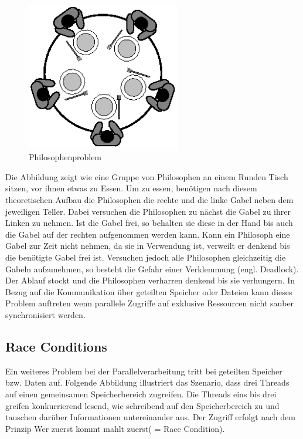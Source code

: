 \documentclass[12pt,oneside,a4paper,bibtotoc,liststotoc]{scrreprt}
\begin{document}
\begin{figure}[H]
  \begin{centering}
    \includegraphics[width=0.6\textwidth]{img/PhilosophenProblem.png}
    \caption{Philosophenproblem \cite[]{philosofen}}
    \label{Philosophenproblem}
  \end{centering}
\end{figure}
Die Abbildung zeigt wie eine Gruppe von Philosophen an einem Runden Tisch sitzen, vor ihnen etwas zu Essen. Um zu essen, benötigen nach diesem theoretischen Aufbau die Philosophen die rechte und die linke Gabel neben dem jeweiligen Teller. Dabei versuchen die Philosophen zu nächst die Gabel zu ihrer Linken zu nehmen. Ist die Gabel frei, so behalten sie diese in der Hand bis auch die Gabel auf der rechten aufgenommen werden kann. Kann ein Philosoph eine Gabel zur Zeit nicht nehmen, da sie in Verwendung ist, verweilt er denkend bis die benötigte Gabel frei ist. Versuchen jedoch alle Philosophen gleichzeitig die Gabeln aufzunehmen, so besteht die Gefahr einer Verklemmung (engl. Deadlock). Der Ablauf stockt und die Philosophen verharren denkend bis sie verhungern. In Bezug auf die Kommunikation über geteilten Speicher oder Dateien kann dieses Problem auftreten wenn parallele Zugriffe auf exklusive Ressourcen nicht sauber synchronisiert werden.



\subsection{Race Conditions}
Ein weiteres Problem bei der Parallelverarbeitung tritt bei geteilten Speicher bzw. Daten auf. Folgende Abbildung illustriert das Szenario, dass drei Threads auf einen gemeinsamen Speicherbereich zugreifen. Die Threads eins bis drei greifen konkurrierend lesend, wie schreibend auf den Speicherbereich zu und tauschen darüber Informationen untereinander aus. Der Zugriff erfolgt nach dem Prinzip \glqq Wer zuerst kommt mahlt zuerst\grqq  ( = Race Condition).
\end{document}
